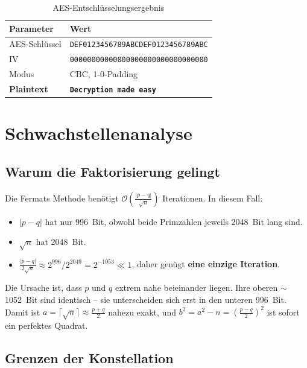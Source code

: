 \documentclass[
    fontsize=12pt,          %
    paper=a4,               %
    numbers=noenddot,       %
    listof=totoc,           %
    listof=entryprefix,     %
    listof=nochaptergap,    %
    bibliography=totoc,     %
    parskip=half,           %
    openany                 %
]{scrbook}
\begin{document}
\begin{table}[H]
    \centering
    \begin{tabular}{l l}
        \toprule
        \textbf{Parameter} & \textbf{Wert} \\
        \midrule
        AES-Schlüssel      & \texttt{DEF0123456789ABCDEF0123456789ABC} \\
        IV                 & \texttt{00000000000000000000000000000000} \\
        Modus              & CBC, 1-0-Padding \\
        \midrule
        \textbf{Plaintext} & \textbf{\texttt{Decryption made easy}} \\
        \bottomrule
    \end{tabular}
    \caption{AES-Entschlüsselungsergebnis}
\end{table}


\section*{Schwachstellenanalyse}


\subsection*{Warum die Faktorisierung gelingt}

Die Fermats Methode benötigt $\mathcal{O}\!\left(\frac{|p-q|}{\sqrt{n}}\right)$ Iterationen.
In diesem Fall:
\begin{itemize}
    \item $|p - q|$ hat nur 996~Bit, obwohl beide Primzahlen jeweils 2048~Bit lang sind.
    \item $\sqrt{n}$ hat 2048~Bit.
    \item $\frac{|p-q|}{2\sqrt{n}} \approx 2^{996} / 2^{2049} = 2^{-1053} \ll 1$, daher genügt \textbf{eine einzige Iteration}.
\end{itemize}

Die Ursache ist, dass $p$ und $q$ extrem nahe beieinander liegen.
Ihre oberen $\sim$1052~Bit sind identisch -- sie unterscheiden sich erst in den unteren 996~Bit.
Damit ist $a = \lceil\sqrt{n}\rceil \approx \frac{p+q}{2}$ nahezu exakt, und $b^2 = a^2 - n = \left(\frac{p-q}{2}\right)^2$ ist sofort ein perfektes Quadrat.


\subsection*{Grenzen der Konstellation}
\end{document}
